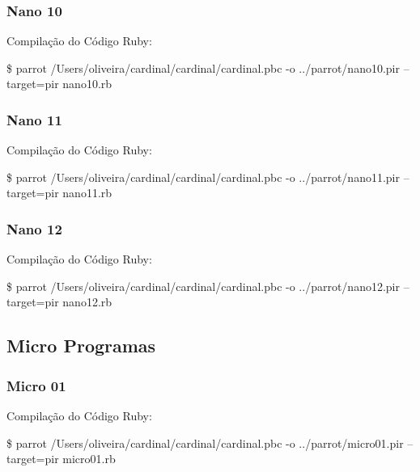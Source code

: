\documentclass[12pt,a4paper,twoside]{report}
\begin{document}
\subsubsection{Nano 10}


Compilação do Código Ruby:
\begin{terminal}
\$ parrot /Users/oliveira/cardinal/cardinal/cardinal.pbc -o
../parrot/nano10.pir --target=pir nano10.rb
\end{terminal}


\subsubsection{Nano 11}


Compilação do Código Ruby:
\begin{terminal}
\$ parrot /Users/oliveira/cardinal/cardinal/cardinal.pbc -o
../parrot/nano11.pir --target=pir nano11.rb
\end{terminal}


\subsubsection{Nano 12}


Compilação do Código Ruby:
\begin{terminal}
\$ parrot /Users/oliveira/cardinal/cardinal/cardinal.pbc -o
../parrot/nano12.pir --target=pir nano12.rb
\end{terminal}


\subsection{Micro Programas}
\subsubsection{Micro 01}


Compilação do Código Ruby:
\begin{terminal}
\$ parrot /Users/oliveira/cardinal/cardinal/cardinal.pbc -o
../parrot/micro01.pir --target=pir micro01.rb
\end{terminal}

\end{document}
